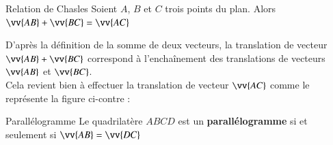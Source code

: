\documentclass[oneside,12pt]{article}          %
\begin{document}
\begin{theoreme}{Relation de Chasles}
Soient $A$, $B$ et $C$ trois points du plan. Alors $\vv{AB}+\vv{BC}=\vv{AC}$
\end{theoreme}

\begin{demonstration}
\begin{minipage}{0.55\linewidth} \restoreskip
    D'après la définition de la somme de deux vecteurs, la translation de vecteur $\vv{AB}+\vv{BC}$ correspond à l'enchaînement des translations de vecteurs $\vv{AB}$ et $\vv{BC}$. \\
    Cela revient bien à effectuer la translation de vecteur $\vv{AC}$ comme le représente la figure ci-contre :
\end{minipage} \hspace{10mm}
\begin{minipage}{0.4\linewidth}
\end{minipage}
\end{demonstration}



\begin{theoreme}{Parallélogramme}
	Le quadrilatère $ABCD$ est un \textbf{parallélogramme} si et seulement si $\vv{AB}=\vv{DC}$
\end{theoreme}
\end{document}
